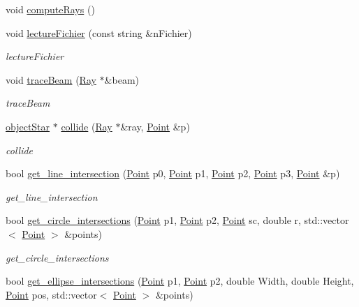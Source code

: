 \begin{DoxyCompactItemize}
void \mbox{\hyperlink{class_level_ad28d918ed43c60e845b8805cf9b6b139}{compute\+Rays}} ()
\item 
void \mbox{\hyperlink{class_level_a97fbfd21ea5677fe64fa8c7add169fff}{lecture\+Fichier}} (const string \&n\+Fichier)
\begin{DoxyCompactList}\small\item\em lecture\+Fichier \end{DoxyCompactList}\item 
void \mbox{\hyperlink{class_level_a855bbc14e3a501596c10650fadbca437}{trace\+Beam}} (\mbox{\hyperlink{class_ray}{Ray}} $\ast$\&beam)
\begin{DoxyCompactList}\small\item\em trace\+Beam \end{DoxyCompactList}\item 
\mbox{\hyperlink{classobject_star}{object\+Star}} $\ast$ \mbox{\hyperlink{class_level_ae5d20d6ebaaa25760a0205505db48c36}{collide}} (\mbox{\hyperlink{class_ray}{Ray}} $\ast$\&ray, \mbox{\hyperlink{class_point}{Point}} \&p)
\begin{DoxyCompactList}\small\item\em collide \end{DoxyCompactList}\item 
bool \mbox{\hyperlink{class_level_a7b4729d15b476dc19ec2c9a62c59ce56}{get\+\_\+line\+\_\+intersection}} (\mbox{\hyperlink{class_point}{Point}} p0, \mbox{\hyperlink{class_point}{Point}} p1, \mbox{\hyperlink{class_point}{Point}} p2, \mbox{\hyperlink{class_point}{Point}} p3, \mbox{\hyperlink{class_point}{Point}} \&p)
\begin{DoxyCompactList}\small\item\em get\+\_\+line\+\_\+intersection \end{DoxyCompactList}\item 
bool \mbox{\hyperlink{class_level_ad66171ce8e8fa75cce202d1c9557cae6}{get\+\_\+circle\+\_\+intersections}} (\mbox{\hyperlink{class_point}{Point}} p1, \mbox{\hyperlink{class_point}{Point}} p2, \mbox{\hyperlink{class_point}{Point}} sc, double r, std\+::vector$<$ \mbox{\hyperlink{class_point}{Point}} $>$ \&points)
\begin{DoxyCompactList}\small\item\em get\+\_\+circle\+\_\+intersections \end{DoxyCompactList}\item 
bool \mbox{\hyperlink{class_level_abb9d591a6b4a10ba57b32a1662ef0e09}{get\+\_\+ellipse\+\_\+intersections}} (\mbox{\hyperlink{class_point}{Point}} p1, \mbox{\hyperlink{class_point}{Point}} p2, double Width, double Height, \mbox{\hyperlink{class_point}{Point}} pos, std\+::vector$<$ \mbox{\hyperlink{class_point}{Point}} $>$ \&points)

\end{DoxyCompactItemize}
